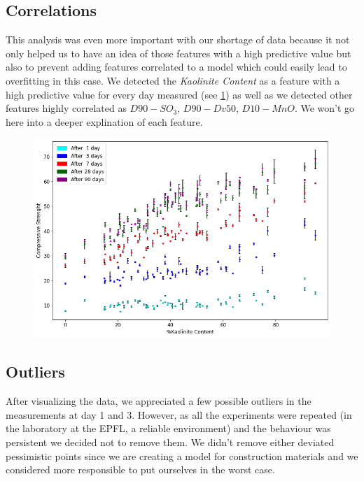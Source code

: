 \documentclass[10pt,conference,compsocconf]{IEEEtran}
\begin{document}
\subsection{Correlations}
This analysis was even more important with our shortage of data because it not only  helped us to have an idea of those features with a high predictive value but also to prevent adding features correlated to a model which could easily lead to overfitting in this case. We detected the \textit{Kaolinite Content} as a feature with a high predictive value for every day measured (see \ref{fig:kaolinite-cs}) as well as we detected other features highly correlated as $D90-SO_3$, $D90-Dv50$, $D10-MnO$. We won't go here into a deeper explination of each feature.

\begin{figure}[tbp]
  \centering
  \includegraphics[width=\textwidth]{figures/cstrength-std.png}
  \vspace{-3mm}
  \label{fig:kaolinite-cs}
\end{figure}

\subsection{Outliers}
After visualizing the data, we appreciated a few possible outliers in the measurements at day 1 and 3. However, as all the experiments were repeated (in the laboratory at the EPFL, a reliable environment) and the behaviour was persistent we decided not to remove them. We didn't remove either deviated pessimistic points since we are creating a model for construction materials and we considered more responsible to put ourselves in the worst case.
\end{document}
